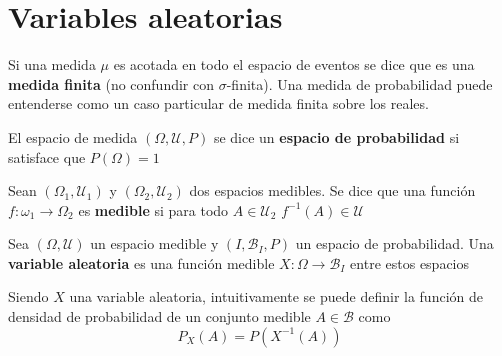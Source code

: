 
\section{Variables aleatorias}

Si una medida $\mu$ es acotada en todo el espacio de eventos se dice que es una \textbf{medida finita} (no confundir con $\sigma$-finita). 
%
Una medida de probabilidad puede entenderse como un caso particular de medida finita sobre los reales.

\begin{definicion}
El espacio de medida $(\Omega,\mathcal{U},P)$ se dice un \textbf{espacio de probabilidad} si satisface que $P(\Omega) = 1$ 
\end{definicion}

\begin{definicion}
Sean $(\Omega_1,\mathcal{U}_1)$ y $(\Omega_2,\mathcal{U}_2)$ dos espacios medibles. Se dice que una función $f: \omega_1 \rightarrow \Omega_2$ es \textbf{medible} si para todo $A\in \mathcal{U}_2$
$f^{-1}(A)\in\mathcal{U}$
\end{definicion}

\begin{definicion}
Sea $(\Omega,\mathcal{U})$ un espacio medible y $(I,\mathcal{B}_I,P)$ un espacio de probabilidad. Una \textbf{variable aleatoria} es una función medible $X: \Omega \rightarrow \mathcal{B}_I$ entre estos espacios
\end{definicion}

Siendo $X$ una variable aleatoria, intuitivamente se puede definir la función de densidad de probabilidad de un conjunto medible $A \in \mathcal{B}$ como
\begin{equation}
P_X(A) = P\left( X^{-1} \left( A \right) \right)
\end{equation}




